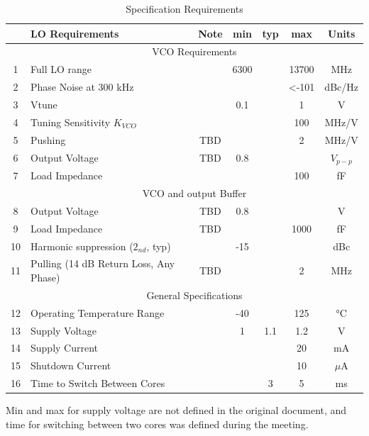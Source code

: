 \documentclass{article}
\begin{document}
\begin{table}[ht]
	\centering
	\begin{tabular}{|c|l|c|c|c|c|c|}
		\hline
		& LO Requirements & Note & min & typ & max & Units \\
		\hline
		& \multicolumn{6}{|c|}{VCO Requirements} \\
		\hline
		1 & Full LO range &  & 6300  &  & 13700 & MHz \\ 
		\hline
		2 & Phase Noise at 300 kHz &  &  &  & <-101 & dBc/Hz \\ 
		\hline
		3 & Vtune &  & 0.1 &  & 1 & V  \\ 
		\hline
		4 & Tuning Sensitivity $K_{VCO}$ &  &  &  & 100 & MHz/V  \\ 
		\hline
		5 & Pushing & TBD &  &  & 2 & MHz/V  \\ 
		\hline
		6 & Output Voltage & TBD & 0.8 &  & & $V_{p-p}$  \\ 
		\hline
		7 & Load Impedance &  &  &  & 100 & fF  \\ 
		\hline
		& \multicolumn{6}{|c|}{VCO and output Buffer} \\
		\hline
		8 & Output Voltage & TBD & 0.8  &  &  & V  \\ 
		\hline
		9 & Load Impedance & TBD &  &  & 1000 & fF  \\ 
		\hline
		10 & Harmonic suppression ($2_{nd}$, typ) &  & -15 &  &  & dBc  \\ 
		\hline
		11 & Pulling (14 dB Return Loss, Any Phase) & TBD &  &  & 2 & MHz  \\ 
		\hline
		& \multicolumn{6}{|c|}{General Specifications} \\
		\hline
		12 & Operating Temperature Range &  & -40 &  & 125 & °C  \\ 
		\hline
		13 & Supply Voltage &  & 1 & 1.1 & 1.2 & V  \\ 
		\hline
		14 & Supply Current &  &  &  & 20 & mA  \\ 
		\hline
		15 & Shutdown Current &  &  &  & 10 & $\mu$A  \\ 
		\hline
		16 & Time to Switch Between Cores  &  &  & 3 & 5 & ms  \\ 
		\hline
	\end{tabular}
	\label{table-spec}
	\caption{Specification Requirements} 

\end{table}

Min and max for supply voltage are not defined in the original document, and time for switching between two cores was defined during the meeting.
\end{document}

